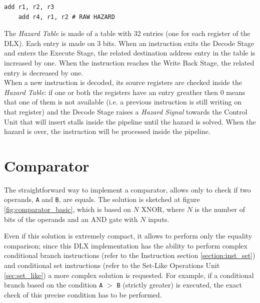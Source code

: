 \begin{lstlisting}[style=mips,nolol, caption={Example of DLX ASM code for RAW Hazard},label=raw_hazard]
	add r1, r2, r3
	add r4, r1, r2 # RAW HAZARD
\end{lstlisting}

The \emph{Hazard Table} is made of a table with 32 entries (one for each register of the DLX). Each entry is made on 3 bits. When an instruction exits the Decode Stage and enters the Execute Stage, the related destination address entry in the table is increased by one. When the instruction reaches the Write Back Stage, the related entry is decreased by one.\\

When a new instruction is decoded, its source registers are checked inside the \emph{Hazard Table}: if one or both the registers have an entry greather then 0 means that one of them is not available (i.e. a previous instruction is still writing on that register) and the Decode Stage raises a \emph{Hazard Signal} towards the Control Unit that will insert stalls inside the pipeline until the hazard is solved. When the hazard is over, the instruction will be processed inside the pipeline.

\section{Comparator}
\label{sec:comparator}
The straightforward way to implement a comparator, allows only to check if two operands, \texttt{A} and \texttt{B}, are equals. The solution is sketched at figure \ref{fig:comparator_basic}, which is based on $N$ XNOR, where $N$ is the number of bits of the operands and an AND gate with $N$ inputs.

Even if this solution is extremely compact, it allows to perform only the equality comparison; since this DLX implementation has the ability to perform complex conditional branch instructions (refer to the Instruction section \ref{section:inst_set}) and conditional set instructions (refer to the Set-Like Operations Unit \ref{sec:set_like}) a more complex solution is requested. For example, if a conditional branch based on the condition \texttt{A} $>$ \texttt{B} (strictly greater) is executed, the exact check of this precise condition has to be performed.

